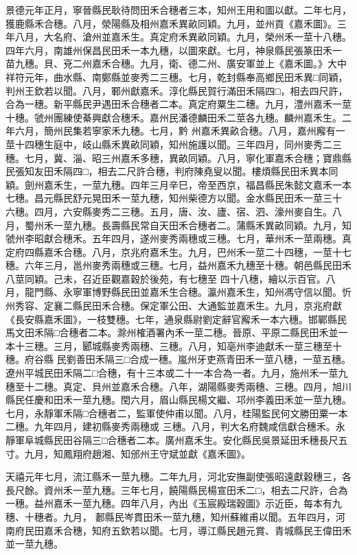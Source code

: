 \begin{pinyinscope}
 景德元年正月，寧晉縣民耿待問田禾合穗者三本，知州王用和圖以獻。二年七月，獲鹿縣禾合穗。八月，滎陽縣及相州嘉禾異畝同穎。九月，並州貢《嘉禾圖》。三年八月，大名府、滄州並嘉禾生。真定府禾異畝同穎。九月，榮州禾一莖十八穗。四年六月，南雄州保昌民田禾一本九穗，以圖來獻。七月，神泉縣民張篆田禾一
 苗九穗。貝、兗二州嘉禾合穗。九月，衛、德二州、廣安軍並上《嘉禾圖。》大中祥符元年，曲水縣、南鄭縣並麥秀二三穗。七月，乾封縣奉高鄉民田禾異□同穎，判州王欽若以聞。八月，鄆州獻嘉禾。淳化縣民賀行滿田禾隔四□，相去四尺許，合為一穗。新平縣民尹遇田禾合穗者二本。真定府粟生二穗。九月，澧州嘉禾一莖十穗。虢州團練使綦興獻合穗禾。嘉州民潘德麟田禾二莖各九穗。麟州嘉禾生。二年六月，簡州民集若寧家禾九穗。七月，黔
 州嘉禾異畝合穗。八月，嘉州廨有一莖十四穗生庭中，岐山縣禾異畝同穎，知州施護以聞。三年四月，同州麥秀二三穗。七月，冀、淄、昭三州嘉禾多穗，異畝同穎。八月，寧化軍嘉禾合穗；寶鼎縣民張知友田禾隔四□，相去二尺許合穗，判府陳堯叟以聞。樓煩縣民田禾異本同穎。劍州嘉禾生，一莖九穗。四年三月辛巳，帝至西京，福昌縣民朱懿文嘉禾一本七穗。昌元縣民舒元晃田禾一莖九穗，知州柴德方以聞。金水縣民田禾一莖三十
 六穗。四月，六安縣麥秀二三穗。五月，唐、汝、廬、宿、泗、濠州麥自生。八月，蜀州禾一莖九穗。長壽縣民常自天田禾合穗者二。蒲縣禾異畝同穎。九月，知虢州李昭獻合穗禾。五年四月，遂州麥秀兩穗或三穗。七月，華州禾一莖兩穗。真定府四縣嘉禾合穗。八月，京兆府嘉禾生。九月，巴州禾一莖二十四穗，一莖十七穗。六年三月，邕州麥秀兩穗或三穗。七月，益州嘉禾九穗至十穗。朝邑縣民田禾八莖同穎。己未，召近臣觀嘉穀於後苑，有七穗至
 四十八穗，繪以示百官。八月，龍門縣、永寧軍博野縣民田並嘉禾生合穗。瀛州嘉禾生，知州馮守信以聞。忻州秀容、定襄二縣民田禾合穗。保定軍公田、大通監並嘉禾生。九月，京兆府獻《長安縣嘉禾圖》，一枝雙穗。七年，通泉縣尉劉定辭官廨禾一本六穗。邯鄲縣民馬文田禾隔□合穗者二本。滁州榷酒署內禾一莖二穗。晉原、平原二縣民田禾並一本十三穗。三月，郾城縣麥秀兩穗、三穗。八月，知亳州李迪獻禾一莖三穗至十穗。府谷縣
 民劉善田禾隔三□合成一穗。嵐州牙吏燕青田禾一莖八穗，一莖五穗。遼州平城民田禾隔二□合穗，有十三本或二十一本合為一者。九月，施州禾一莖九穗至十二穗。真定、貝州並嘉禾合穗。八年，湖陽縣麥秀兩穗、三穗。四月，旭川縣民任慶和田禾一莖九穗。閏六月，眉山縣民楊文繼、邛州李義田禾並一莖九穗。七月，永靜軍禾隔□合穗者二，監軍使仲甫以聞。八月，桂陽監民何文勝田粟一本二穗。九年四月，建初縣麥秀兩穗或
 三穗。八月，判大名府魏咸信獻合穗禾。永靜軍阜城縣民田谷隔三□合穗者二本。廣州嘉禾生。安化縣民吳景延田禾穗長尺五寸。九月，知鳳翔府趙湘、知邠州王守斌並獻《嘉禾圖》。



 天禧元年七月，流江縣禾一莖九穗。二年九月，河北安撫副使張昭遠獻穀穗三，各長尺餘。資州禾一莖九穗。三年七月，饒陽縣民楊宣田禾二□，相去二尺許，合為一穗。益州嘉禾一莖九穗。四年八月，內出《玉宸殿瑞穀圖》示近臣，每本有九穗、十穗者。九月，
 郪縣民岑貫田禾一莖九穗，知州蘇維甫以聞。五年四月，河南府民田嘉禾合穗，知府五欽若以聞。七月，導江縣民趙元賞、青城縣民王偉田禾並一莖九穗。




\end{pinyinscope}
